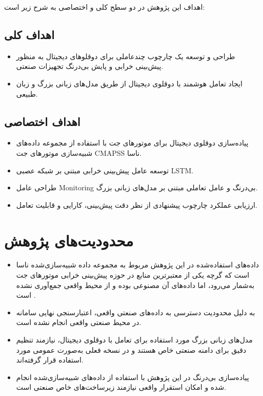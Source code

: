 اهداف این پژوهش در دو سطح کلی و اختصاصی به شرح زیر است:

\subsection*{اهداف کلی}
\begin{itemize}
	\item طراحی و توسعه یک چارچوب چندعاملی برای دوقلوهای دیجیتال به منظور پیش‌بینی خرابی و پایش بی‌درنگ تجهیزات صنعتی.
	\item ایجاد تعامل هوشمند با دوقلوی دیجیتال از طریق مدل‌های زبانی بزرگ و زبان طبیعی.
\end{itemize}

\subsection*{اهداف اختصاصی}
\begin{itemize}
	\item پیاده‌سازی دوقلوی دیجیتال برای موتورهای جت با استفاده از مجموعه داده‌های شبیه‌سازی موتورهای جت  \gls{CMAPSS} ناسا.
	\item توسعه عامل پیش‌بینی خرابی مبتنی بر شبکه عصبی \gls{LSTM}.
	\item طراحی عامل \gls{Monitoring} بی‌درنگ و عامل تعاملی مبتنی بر مدل‌های زبانی بزرگ.
	\item ارزیابی عملکرد چارچوب پیشنهادی از نظر دقت پیش‌بینی، کارایی و قابلیت تعامل.
\end{itemize}



\section{محدودیت‌های پژوهش}

\begin{itemize}
	\item
	 داده‌های استفاده‌شده در این پژوهش مربوط به مجموعه داده شبیه‌سازی‌شده  ناسا است که گرچه یکی از معتبرترین منابع در حوزه پیش‌بینی خرابی موتورهای جت به‌شمار می‌رود، اما داده‌های آن مصنوعی بوده و از محیط واقعی جمع‌آوری نشده است \cite{NASA2007C-MAPSS}.
	\item
	 به دلیل محدودیت دسترسی به داده‌های صنعتی واقعی، اعتبارسنجی نهایی سامانه در محیط صنعتی واقعی انجام نشده است.
	\item
	 مدل‌های زبانی بزرگ مورد استفاده برای تعامل با دوقلوی دیجیتال، نیازمند تنظیم دقیق برای دامنه صنعتی خاص هستند و در نسخه فعلی به‌صورت عمومی مورد استفاده قرار گرفته‌اند.
	\item
	 پیاده‌سازی بی‌درنگ در این پژوهش با استفاده از داده‌های شبیه‌سازی‌شده انجام شده و امکان استقرار واقعی نیازمند زیرساخت‌های خاص صنعتی است.
\end{itemize}



